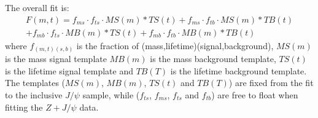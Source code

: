 \documentclass[a4paper,12pt]{article}
\begin{document}
The overall fit is:
\begin{multline}
 F(m,t) = f_{ms} \cdot f_{ts} \cdot MS(m) \ast TS(t) + f_{ms} \cdot f_{tb} \cdot MS(m) \ast TB(t) \\
 + f_{mb} \cdot f_{ts} \cdot MB(m) \ast TS(t) + f_{mb} \cdot f_{tb} \cdot MB(m) \ast TB(t)
\end{multline}
where $f_{(m,t)(s,b)}$ is the fraction of (mass,lifetime)(signal,background), $MS(m)$ is the mass signal template $MB(m)$ is the mass background template, $TS(t)$ is the lifetime signal template and $TB(T)$ is the lifetime background template. The templates ($MS(m)$, $MB(m)$, $TS(t)$ and $TB(T)$) are fixed from the fit to the inclusive $J\slash \psi$ sample, while ($f_{ts}$, $f_{ms}$, $f_{ts}$ and $f_{tb}$) are free to float when fitting the $Z+J\slash \psi$ data.
\end{document}
